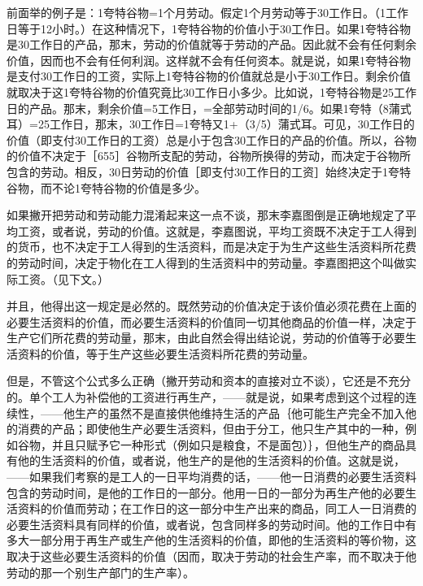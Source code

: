 前面举的例子是：1夸特谷物=1个月劳动。假定1个月劳动等于30工作日。（1工作日等于12小时。）在这种情况下，1夸特谷物的价值小于30工作日。如果1夸特谷物是30工作日的产品，那末，劳动的价值就等于劳动的产品。因此就不会有任何剩余价值，因而也不会有任何利润。这样就不会有任何资本。就是说，如果1夸特谷物是支付30工作日的工资，实际上1夸特谷物的价值就总是小于30工作日。剩余价值就取决于这1夸特谷物的价值究竟比30工作日小多少。比如说，1夸特谷物是25工作日的产品。那末，剩余价值=5工作日，=全部劳动时间的1/6。如果1夸特（8蒲式耳）=25工作日，那末，30工作日=1夸特又1+（3/5）蒲式耳。可见，30工作日的价值（即支付30工作日的工资）总是小于包含30工作日的产品的价值。所以，谷物的价值不决定于［655］谷物所支配的劳动，谷物所换得的劳动，而决定于谷物所包含的劳动。相反，30日劳动的价值［即支付30工作日的工资］始终决定于1夸特谷物，而不论1夸特谷物的价值是多少。


如果撇开把劳动和劳动能力混淆起来这一点不谈，那末李嘉图倒是正确地规定了平均工资，或者说，劳动的价值。这就是，李嘉图说，平均工资既不决定于工人得到的货币，也不决定于工人得到的生活资料，而是决定于为生产这些生活资料所花费的劳动时间，决定于物化在工人得到的生活资料中的劳动量。李嘉图把这个叫做实际工资。（见下文。）

并且，他得出这一规定是必然的。既然劳动的价值决定于该价值必须花费在上面的必要生活资料的价值，而必要生活资料的价值同一切其他商品的价值一样，决定于生产它们所花费的劳动量，那末，由此自然会得出结论说，劳动的价值等于必要生活资料的价值，等于生产这些必要生活资料所花费的劳动量。

但是，不管这个公式多么正确（撇开劳动和资本的直接对立不谈），它还是不充分的。单个工人为补偿他的工资进行再生产，——就是说，如果考虑到这个过程的连续性，——他生产的虽然不是直接供他维持生活的产品｛他可能生产完全不加入他的消费的产品；即使他生产必要生活资料，但由于分工，他只生产其中的一种，例如谷物，并且只赋予它一种形式（例如只是粮食，不是面包）｝，但他生产的商品具有他的生活资料的价值，或者说，他生产的是他的生活资料的价值。这就是说，——如果我们考察的是工人的一日平均消费的话，——他一日消费的必要生活资料包含的劳动时间，是他的工作日的一部分。他用一日的一部分为再生产他的必要生活资料的价值而劳动；在工作日的这一部分中生产出来的商品，同工人一日消费的必要生活资料具有同样的价值，或者说，包含同样多的劳动时间。他的工作日中有多大一部分用于再生产或生产他的生活资料的价值，即他的生活资料的等价物，这取决于这些必要生活资料的价值（因而，取决于劳动的社会生产率，而不取决于他劳动的那一个别生产部门的生产率）。

